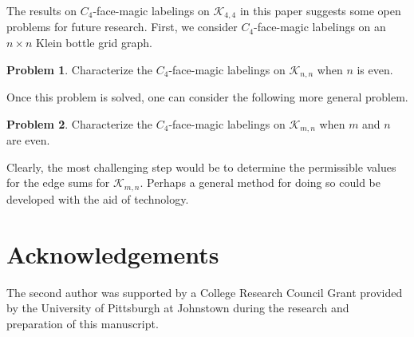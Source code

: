 \documentclass[10pt, reqno]{amsart}
\theoremstyle{definition}
\newtheorem{problem}{Problem}
\theoremstyle{plain}
\begin{document}
The results on $C_4$-face-magic labelings on $\mathcal{K}_{4,4}$ in this paper suggests some open problems for future research.
First, we consider $C_4$-face-magic labelings on an $n\times n$ Klein bottle grid graph.

\begin{problem}
    Characterize the $C_4$-face-magic labelings
    on  $\mathcal{K}_{n,n}$ when $n$ is even.
\end{problem}

Once this problem is solved, one can consider the following more general problem.


\begin{problem}
    Characterize the $C_4$-face-magic labelings
    on  $\mathcal{K}_{m,n}$ when $m$ and $n$ are even.
\end{problem}

Clearly, the most challenging step would be to determine the permissible values for the edge sums for $\mathcal{K}_{m,n}$. Perhaps a general method for doing so could be developed with the aid of technology.

\section{Acknowledgements}
The second author was supported by a College Research Council Grant
provided by the University of Pittsburgh at Johnstown
during the research and preparation of this manuscript.
\end{document}
